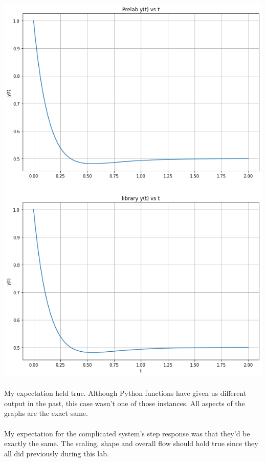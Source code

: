 \documentclass[12pt]{report}
\begin{document}
    \includegraphics[scale=0.6]{prelab compare.png}
    
    \paragraph{} My expectation held true. Although Python functions have given us different output in the past, this case wasn't one of those instances. All aspects of the graphs are the exact same.  
    
    \paragraph{} My expectation for the complicated system's step response was that they'd be exactly the same. The scaling, shape and overall flow should hold true since they all did previously during this lab.
    
\end{document}
